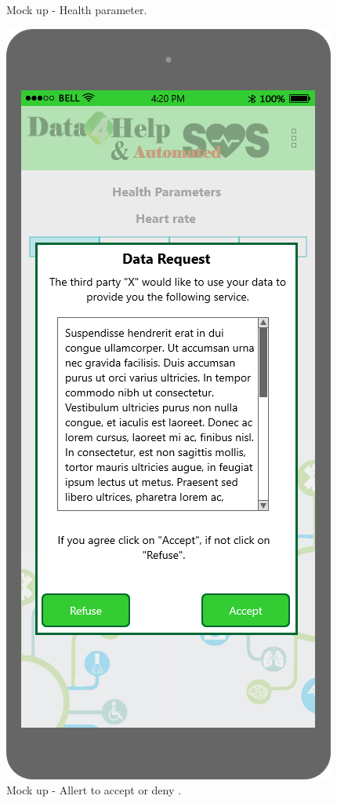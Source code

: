 \begin{figure}[h!]
\begin{minipage}[b]{0.25\textwidth}
    		\caption{Mock up - Health parameter.}
	\end{minipage}
	\hfill
	\begin{minipage}[b]{0.25\textwidth}
    		\includegraphics[width=\textwidth]{./pictures/notification.png}
    		\caption{Mock up - Allert to accept or deny .}
	\end{minipage}
\end{figure}



